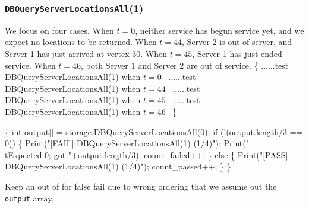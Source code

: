 \documentclass{article}
\def\nwendcode{\endtrivlist \endgroup}
\let\nwdocspar=\par
\begin{document}
\subsubsection{{\tt{}DBQueryServerLocationsAll}(1)}
We focus on four cases. When $t=0$, neither service has begun service yet,
and we expect no locations to be returned. When $t=44$, Server 2 is out of
server, and Server 1 has just arrived at vertex 30. When $t=45$, Server 1
has just ended service. When $t=46$, both Server 1 and Server 2 are out of
service.
\nwenddocs{}\endmoddef{}
\{
  \LA{}......test \code{}DBQueryServerLocationsAll\edoc{}(1) when $t=0$~{\nwtagstyle{}}\RA{}
  \LA{}......test \code{}DBQueryServerLocationsAll\edoc{}(1) when $t=44$~{\nwtagstyle{}}\RA{}
  \LA{}......test \code{}DBQueryServerLocationsAll\edoc{}(1) when $t=45$~{\nwtagstyle{}}\RA{}
  \LA{}......test \code{}DBQueryServerLocationsAll\edoc{}(1) when $t=46$~{\nwtagstyle{}}\RA{}
\}
\nwendcode{}\nwdocspar
\nwenddocs{}\endmoddef{}
\{
  int output[] = storage.DBQueryServerLocationsAll(0);
  if (!(output.length/3 == 0)) \{
    Print("[FAIL] DBQueryServerLocationsAll(1) (1/4)");
    Print("\\tExpected 0; got "+output.length/3);
    count_failed++;
  \} else \{
    Print("[PASS] DBQueryServerLocationsAll(1) (1/4)");
    count_passed++;
  \}
\}
\nwendcode{}\nwdocspar
Keep an out of for false fail due to wrong ordering that we assume out
the {\tt{}output} array.
\nwenddocs{}\endmoddef{}
\end{document}
